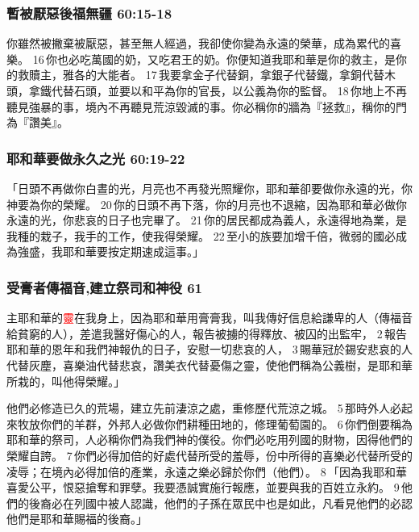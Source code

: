 \subsubsection{暫被厭惡後福無疆 60:15-18}
你雖然被撇棄被厭惡，甚至無人經過，我卻使你變為永遠的榮華，成為累代的喜樂。 16 你也必吃萬國的奶，又吃君王的奶。你便知道我耶和華是你的救主，是你的救贖主，雅各的大能者。 17 我要拿金子代替銅，拿銀子代替鐵，拿銅代替木頭，拿鐵代替石頭，並要以和平為你的官長，以公義為你的監督。 18 你地上不再聽見強暴的事，境內不再聽見荒涼毀滅的事。你必稱你的牆為『拯救』，稱你的門為『讚美』。

\subsubsection{耶和華要做永久之光 60:19-22}
「日頭不再做你白晝的光，月亮也不再發光照耀你，耶和華卻要做你永遠的光，你神要為你的榮耀。 20 你的日頭不再下落，你的月亮也不退縮，因為耶和華必做你永遠的光，你悲哀的日子也完畢了。 21 你的居民都成為義人，永遠得地為業，是我種的栽子，我手的工作，使我得榮耀。 22 至小的族要加增千倍，微弱的國必成為強盛，我耶和華要按定期速成這事。」


\subsubsection{受膏者傳福音,建立祭司和神役 61}
主耶和華的\textcolor{red}{靈}在我身上，因為耶和華用膏膏我，叫我傳好信息給謙卑的人（傳福音給貧窮的人），差遣我醫好傷心的人，報告被擄的得釋放、被囚的出監牢， 2 報告耶和華的恩年和我們神報仇的日子，安慰一切悲哀的人， 3 賜華冠於錫安悲哀的人代替灰塵，喜樂油代替悲哀，讚美衣代替憂傷之靈，使他們稱為公義樹，是耶和華所栽的，叫他得榮耀。」

他們必修造已久的荒場，建立先前淒涼之處，重修歷代荒涼之城。 5 那時外人必起來牧放你們的羊群，外邦人必做你們耕種田地的，修理葡萄園的。 6 你們倒要稱為耶和華的祭司，人必稱你們為我們神的僕役。你們必吃用列國的財物，因得他們的榮耀自誇。 7 你們必得加倍的好處代替所受的羞辱，份中所得的喜樂必代替所受的凌辱；在境內必得加倍的產業，永遠之樂必歸於你們（他們）。 8 「因為我耶和華喜愛公平，恨惡搶奪和罪孽。我要憑誠實施行報應，並要與我的百姓立永約。 9 他們的後裔必在列國中被人認識，他們的子孫在眾民中也是如此，凡看見他們的必認他們是耶和華賜福的後裔。」

